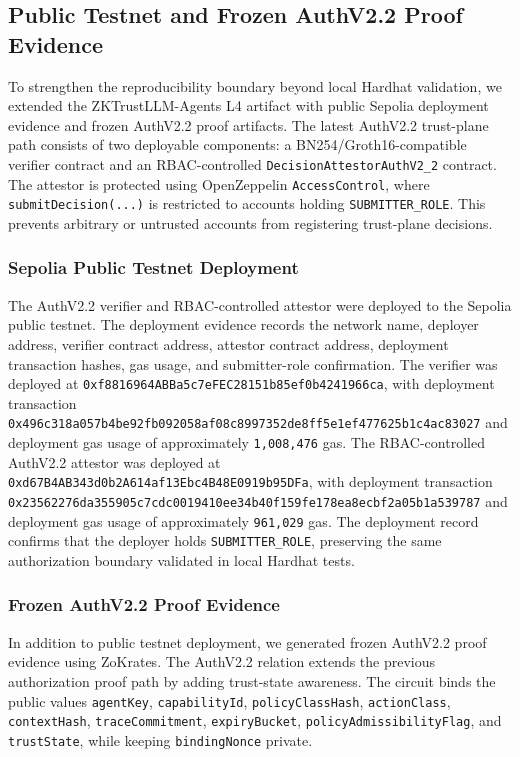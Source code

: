 \subsection{Public Testnet and Frozen AuthV2.2 Proof Evidence}

To strengthen the reproducibility boundary beyond local Hardhat validation, we extended the ZKTrustLLM-Agents L4 artifact with public Sepolia deployment evidence and frozen AuthV2.2 proof artifacts. The latest AuthV2.2 trust-plane path consists of two deployable components: a BN254/Groth16-compatible verifier contract and an RBAC-controlled \texttt{DecisionAttestorAuthV2\_2} contract. The attestor is protected using OpenZeppelin \texttt{AccessControl}, where \texttt{submitDecision(...)} is restricted to accounts holding \texttt{SUBMITTER\_ROLE}. This prevents arbitrary or untrusted accounts from registering trust-plane decisions.

\subsubsection{Sepolia Public Testnet Deployment}

The AuthV2.2 verifier and RBAC-controlled attestor were deployed to the Sepolia public testnet. The deployment evidence records the network name, deployer address, verifier contract address, attestor contract address, deployment transaction hashes, gas usage, and submitter-role confirmation. The verifier was deployed at \texttt{0xf8816964ABBa5c7eFEC28151b85ef0b4241966ca}, with deployment transaction \texttt{0x496c318a057b4be92fb092058af08c8997352de8ff5e1ef477625b1c4ac83027} and deployment gas usage of approximately \texttt{1,008,476} gas. The RBAC-controlled AuthV2.2 attestor was deployed at \texttt{0xd67B4AB343d0b2A614af13Ebc4B48E0919b95DFa}, with deployment transaction \texttt{0x23562276da355905c7cdc0019410ee34b40f159fe178ea8ecbf2a05b1a539787} and deployment gas usage of approximately \texttt{961,029} gas. The deployment record confirms that the deployer holds \texttt{SUBMITTER\_ROLE}, preserving the same authorization boundary validated in local Hardhat tests.

\subsubsection{Frozen AuthV2.2 Proof Evidence}

In addition to public testnet deployment, we generated frozen AuthV2.2 proof evidence using ZoKrates. The AuthV2.2 relation extends the previous authorization proof path by adding trust-state awareness. The circuit binds the public values \texttt{agentKey}, \texttt{capabilityId}, \texttt{policyClassHash}, \texttt{actionClass}, \texttt{contextHash}, \texttt{traceCommitment}, \texttt{expiryBucket}, \texttt{policyAdmissibilityFlag}, and \texttt{trustState}, while keeping \texttt{bindingNonce} private.

